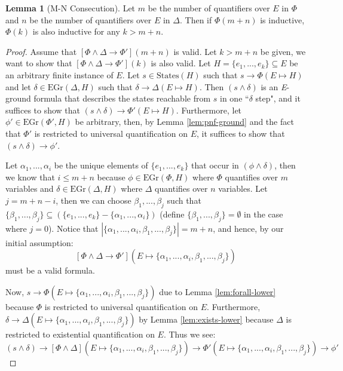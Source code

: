 \documentclass[12pt]{article}
\theoremstyle{definition}
\newtheorem{lemma}{Lemma}
\theoremstyle{remark}
\newcommand{\states}{\text{States}}
\newcommand{\gr}{\text{EGr}}
\begin{document}
\begin{lemma}[M-N Consecution]
  \label{ref:consecution}
  Let $m$ be the number of quantifiers over $E$ in $\Phi$ and $n$ be the number of quantifiers over $E$ in $\Delta$.  Then if $\Phi(m+n)$ is inductive, $\Phi(k)$ is also inductive for any $k>m+n$.
\end{lemma}
\begin{proof}
  Assume that $[\Phi\land\Delta \rightarrow \Phi'](m+n)$ is valid.  Let $k>m+n$ be given, we want to show that $[\Phi\land\Delta \rightarrow \Phi'](k)$ is also valid.  Let $H = \{e_1,...,e_k\} \subseteq E$ be an arbitrary finite instance of $E$.  Let $s \in \states(H)$ such that $s \rightarrow \Phi(E \mapsto H)$ and let $\delta \in \gr(\Delta,H)$ such that $\delta \rightarrow \Delta(E \mapsto H)$.  Then $(s \land \delta)$ is an \textit{E}-ground formula that describes the states reachable from $s$ in one ``$\delta$ step", and it suffices to show that $(s \land \delta) \rightarrow \Phi'(E \mapsto H)$.  Furthermore, let $\phi' \in \gr(\Phi',H)$ be arbitrary, then, by Lemma \ref{lem:pnf-ground} and the fact that $\Phi'$ is restricted to universal quantification on $E$, it suffices to show that $(s \land \delta) \rightarrow \phi'$.

  Let $\alpha_1,...,\alpha_i$ be the unique elements of $\{e_1,...,e_k\}$ that occur in $(\phi \land \delta)$, then we know that $i \leq m+n$ because $\phi \in \gr(\Phi,H)$ where $\Phi$ quantifies over $m$ variables and $\delta \in \gr(\Delta,H)$ where $\Delta$ quantifies over $n$ variables.  Let $j = m+n-i$, then we can choose $\beta_1,...,\beta_j$ such that $\{\beta_1,...,\beta_j\} \subseteq (\{e_1,...,e_k\}-\{\alpha_1,...,\alpha_i\})$ (define $\{\beta_1,...,\beta_j\}=\emptyset$ in the case where $j=0$).  Notice that $|\{\alpha_1,...,\alpha_i,\beta_1,...,\beta_j\}|=m+n$, and hence, by our initial assumption:
  $$[\Phi\land\Delta \rightarrow \Phi'](E \mapsto \{\alpha_1,...,\alpha_i,\beta_1,...,\beta_j\})$$
  must be a valid formula.

  Now, $s \rightarrow \Phi(E \mapsto \{\alpha_1,...,\alpha_i,\beta_1,...,\beta_j\})$ due to Lemma \ref{lem:forall-lower} because $\Phi$ is restricted to universal quantification on $E$.  Furthermore, $\delta \rightarrow \Delta(E \mapsto \{\alpha_1,...,\alpha_i,\beta_1,...,\beta_j\})$ by Lemma \ref{lem:exists-lower} because $\Delta$ is restricted to existential quantification on $E$.  Thus we see:
  $$(s \land \delta) \rightarrow [\Phi\land\Delta](E \mapsto \{\alpha_1,...,\alpha_i,\beta_1,...,\beta_j\}) \rightarrow \Phi'(E \mapsto \{\alpha_1,...,\alpha_i,\beta_1,...,\beta_j\}) \rightarrow \phi'$$
\end{proof}
\end{document}
